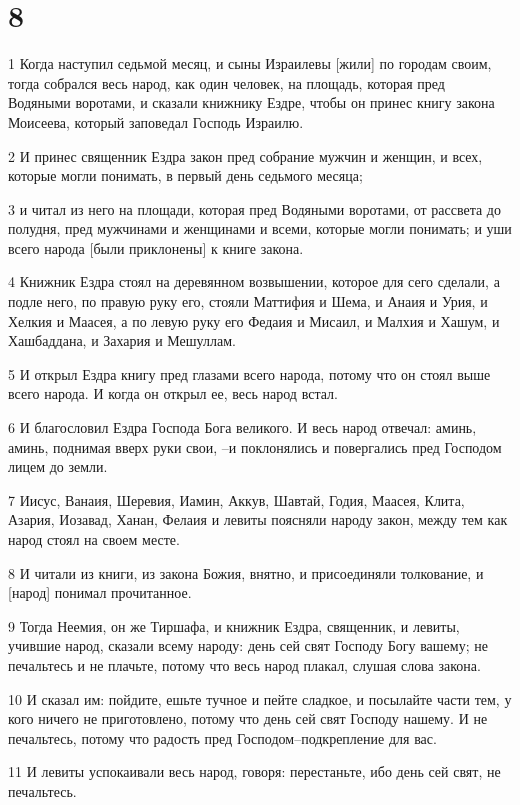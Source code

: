 \chapter{8}

\par 1 Когда наступил седьмой месяц, и сыны Израилевы [жили] по городам своим, тогда собрался весь народ, как один человек, на площадь, которая пред Водяными воротами, и сказали книжнику Ездре, чтобы он принес книгу закона Моисеева, который заповедал Господь Израилю.
\par 2 И принес священник Ездра закон пред собрание мужчин и женщин, и всех, которые могли понимать, в первый день седьмого месяца;
\par 3 и читал из него на площади, которая пред Водяными воротами, от рассвета до полудня, пред мужчинами и женщинами и всеми, которые могли понимать; и уши всего народа [были приклонены] к книге закона.
\par 4 Книжник Ездра стоял на деревянном возвышении, которое для сего сделали, а подле него, по правую руку его, стояли Маттифия и Шема, и Анаия и Урия, и Хелкия и Маасея, а по левую руку его Федаия и Мисаил, и Малхия и Хашум, и Хашбаддана, и Захария и Мешуллам.
\par 5 И открыл Ездра книгу пред глазами всего народа, потому что он стоял выше всего народа. И когда он открыл ее, весь народ встал.
\par 6 И благословил Ездра Господа Бога великого. И весь народ отвечал: аминь, аминь, поднимая вверх руки свои, --и поклонялись и повергались пред Господом лицем до земли.
\par 7 Иисус, Ванаия, Шеревия, Иамин, Аккув, Шавтай, Годия, Маасея, Клита, Азария, Иозавад, Ханан, Фелаия и левиты поясняли народу закон, между тем как народ стоял на своем месте.
\par 8 И читали из книги, из закона Божия, внятно, и присоединяли толкование, и [народ] понимал прочитанное.
\par 9 Тогда Неемия, он же Тиршафа, и книжник Ездра, священник, и левиты, учившие народ, сказали всему народу: день сей свят Господу Богу вашему; не печальтесь и не плачьте, потому что весь народ плакал, слушая слова закона.
\par 10 И сказал им: пойдите, ешьте тучное и пейте сладкое, и посылайте части тем, у кого ничего не приготовлено, потому что день сей свят Господу нашему. И не печальтесь, потому что радость пред Господом--подкрепление для вас.
\par 11 И левиты успокаивали весь народ, говоря: перестаньте, ибо день сей свят, не печальтесь.

